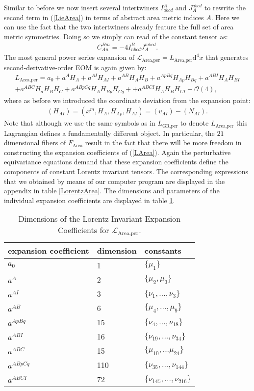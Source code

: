 Similar to before we now insert several intertwiners $I^A_{abcd}$ and $J_A^{abcd}$ to rewrite the second term in (\ref{LieArea}) in terms of abstract area metric indices $A$. Here we can use the fact that the two intertwiners already feature the full set of area metric symmetries.  Doing so we simply can read of the constant tensor as:
\begin{align}\label{areaGotayMInter}
    C_{An}^{Bm} = -4 I^B_{nbcd} J_A^{mbcd}.
\end{align}
The most general power series expansion of $\mathcal{L}_{\text{Area,per}} = L_{\text{Area,per}}\mathrm{d}^4x$ that generates second-derivative-order EOM is again given by:
\begin{align}\label{LArea}
    L_{\text{Area,per}} =  a_0 + a^A H_A + a^{AI}H_{AI} + a^{AB} H_{A}H_{B} + a^{ApBq} H_{Ap}H_{Bq} + a^{ABI} H_{A} H_{BI} \\
    + a^{ABC} H_a H_B H_C + a^{ABpCq} H_{A}H_{Bp}H_{Cq} +
    + a^{ABCI} H_A H_B H_{CI} 
    + \mathcal{O}(4),
\end{align}
where as before we introduced the coordinate deviation from the expansion point: 
\begin{align}
(H_{AI}) = (x^m,H_A,H_{Ap},H_{AI}) = (v_{AI}) - (N_{AI}).
\end{align}
Note that although we use the same symbols as in $L_{\text{GR,per}}$ to denote $L_{\text{Area,per}}$ this Lagrangian defines a fundamentally different object. In particular, the $21$ dimensional fibers of  $F_{\text{Area}}$ result in the fact that there will be more freedom in constructing the expansion coefficients of (\ref{LArea}). Again the perturbative equivariance equations demand that these expansion coefficients define the components of constant Lorentz invariant tensors. The corresponding expressions that we obtained by means of our computer program are displayed in the appendix in table \ref{LorentzArea}. The dimensions and parameters of the individual expansion coefficients are displayed in table \ref{AreaExp}.
\begin{table}
\centering 
\begin{tabular}{lll} \toprule
    expansion coefficient & dimension & constants   \\ \midrule
    $a_0$ & 1 & $\{\mu_1\}$ \\
    $a^A$ & 2 & $\{\mu_2,\mu_3\}$ \\
    $a^{AI}$ & 3 & $\{\nu_1,..., \nu_3\}$ \\
    $a^{AB}$ & 6 & $\{\mu_4,..., \mu_9 \} $ \\
    $a^{ApBq}$ & 15 & $\{\nu_4,...,\nu_{18}\}$ \\
    $a^{ABI}$ & 16 & $\{ \nu_{19},...,\nu_{34} \}$ \\
    $a^{ABC}$ & 15 & $\{ \mu_{10},...\mu_{24} \}$\\
    $a^{ABpCq}$ & 110 & $\{\nu_{35},...,\nu_{144} \}$ \\
    $a^{ABCI}$ & 72 & $\{ \nu_{145},...,\nu_{216}\}$ \\ \bottomrule
\end{tabular}
\caption{Dimensions of the Lorentz Invariant Expansion Coefficients for $\mathcal{L}_{\text{Area,per}}$.}\label{AreaExp}
\end{table}
